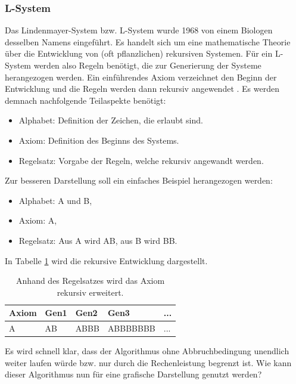 \documentclass[../mciAusarbeitung.tex]{subfiles}
\begin{document}
\subsubsection{L-System}

Das Lindenmayer-System bzw. L-System wurde 1968 von einem Biologen desselben Namens eingeführt. Es handelt sich um eine mathematische Theorie über die Entwicklung von (oft pflanzlichen) rekursiven Systemen. Für ein L-System werden also Regeln benötigt, die zur Generierung der Systeme herangezogen werden. Ein einführendes Axiom verzeichnet den Beginn der Entwicklung und die Regeln werden dann rekursiv angewendet \cite{wiki2018lsystem}. Es werden demnach nachfolgende Teilaspekte benötigt:
\begin{itemize}
\item Alphabet: Definition der Zeichen, die erlaubt sind.
\item Axiom: Definition des Beginns des Systems.
\item Regelsatz: Vorgabe der Regeln, welche rekursiv angewandt werden.
\end{itemize}
Zur besseren Darstellung soll ein einfaches Beispiel herangezogen werden:
\begin{itemize}
\item Alphabet: A und B,
\item Axiom: A,
\item Regelsatz: Aus A wird AB, aus B wird BB.
\end{itemize}
In Tabelle \ref{tab:l-system-beispiel} wird die rekursive Entwicklung dargestellt.

\begin{table}[H]
\begin{tabular}{@{}|l|l|l|l|l|@{}}
\toprule
\textbf{Axiom} & \textbf{Gen1} & \textbf{Gen2} & \textbf{Gen3} & \textbf{...} \\ \midrule
A              & AB            & ABBB          & ABBBBBBB      & ...          \\ \bottomrule
\end{tabular}
\caption{Anhand des Regelsatzes wird das Axiom rekursiv erweitert.}
\label{tab:l-system-beispiel}
\end{table}

Es wird schnell klar, dass der Algorithmus ohne Abbruchbedingung unendlich weiter laufen würde bzw. nur durch die Rechenleistung begrenzt ist. Wie kann dieser Algorithmus nun für eine grafische Darstellung genutzt werden? 
\end{document}

